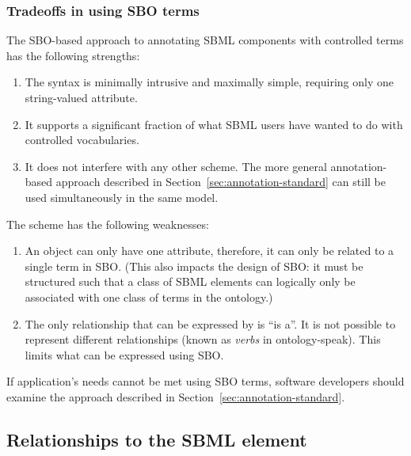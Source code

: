 \begin{blockChanged}

\subsubsection{Tradeoffs in using SBO terms}

The SBO-based approach to annotating SBML components with
controlled terms has the following strengths:
\begin{enumerate}

\item The syntax is minimally intrusive and maximally simple,
  requiring only one string-valued attribute.

\item It supports a significant fraction of what SBML users have wanted
  to do with controlled vocabularies.

\item It does not interfere with any other scheme.  The more
  general annotation-based approach described in
  Section~\ref{sec:annotation-standard} can still be used
  simultaneously in the same model.

\end{enumerate}

The scheme has the following weaknesses:
\begin{enumerate}

\item An object can only have one  attribute,
  therefore, it can only be related to a single term in SBO.
  (This also impacts the design of SBO: it must be structured such
  that a class of SBML elements can logically only be associated
  with one class of terms in the ontology.)

\item The only relationship that can be expressed by
   is ``is a''.  It is not possible to represent
  different relationships (known as \emph{verbs} in
  ontology-speak).  This limits what can be expressed using SBO.

\end{enumerate}

  If application's
needs cannot be met using SBO terms, software developers should
examine the approach described in
Section~\ref{sec:annotation-standard}.

\subsection{Relationships to the SBML  element}


\end{blockChanged}
